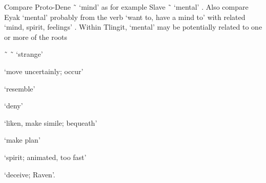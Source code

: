 \begin{morphdesc}[resume*=alphalist]
	Compare Proto-Dene  \~\  ‘mind’
		\parencites[22]{krauss-leer:1981}[11]{leer:2008}
		as for example Slave  \~\  ‘mental’ \parencite[608]{rice:1989}.
	Also compare Eyak  ‘mental’
		\parencites[2087, 2133, 2162]{krauss:1970}[135 fn.\ 50]{leer:1991}[378]{krauss:2015}
		probably from the verb  ‘want to, have a mind to’
		\parencites[2148]{krauss:1970}[211, 626]{krauss:2015}
		with related  ‘mind, spirit, feelings’
		\parencites[5]{krauss:1981a}[87, 513, 527]{krauss:2015}.
	Within Tlingit,  ‘mental’ may be potentially related to one or more of the roots
		\begin{inlinelist}
		\item	{} \~\  \~\  ‘strange’
		\item	{} ‘move uncertainly; occur’
		\item	{} ‘resemble’
		\item	{} ‘deny’
		\item	{} ‘liken, make simile; bequeath’
		\item	{} ‘make plan’
		\item	{} ‘spirit; animated, too fast’
		\item	{} ‘deceive; Raven’.
		\end{inlinelist}


\end{morphdesc}
